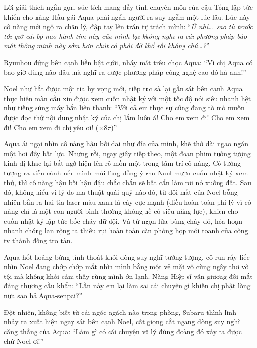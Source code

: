 \documentclass[../main.tex]{subfiles}
\begin{document}
Lời giải thích ngắn gọn, súc tích mang đầy tính chuyên môn của cậu Tổng lập tức khiến cho nàng Hầu gái Aqua phải ngẩn người ra suy ngẫm một lúc lâu. Lúc này cô nàng mới ngộ ra chân lý, đập tay lên trán tự trách mình: ``\textit{Ừ nhỉ\dots\ sao từ trước tới giờ cái bộ não hành tím này của mình lại không nghĩ ra cái phương pháp bảo mật thông minh này sớm hơn chút có phải đỡ khổ rồi không chứ\dots?}''

Ryuuhou đứng bên cạnh liền bật cười, nháy mắt trêu chọc Aqua: ``Vì chị Aqua có bao giờ dùng não đâu mà nghĩ ra được phương pháp công nghệ cao đó hả anh!''

Noel như bắt được một tia hy vọng mới, tiếp tục sà lại gần sát bên cạnh Aqua thực hiện màn cầu xin được xem cuốn nhật ký với một tốc độ nói siêu nhanh hệt như tiếng súng máy bắn liên thanh: ``Với cả em thực sự cũng đang tò mò muốn được đọc thử nội dung nhật ký của chị lắm luôn á! Cho em xem đi! Cho em xem đi! Cho em xem đi chị yêu ơi! (\(\times8\pi\))''

Aqua ái ngại nhìn cô nàng hậu bối dai như đỉa của mình, khẽ thở dài ngao ngán một hơi đầy bất lực. Nhưng rồi, ngay giây tiếp theo, một đoạn phim tưởng tượng kinh dị khác lại bất ngờ hiện lên rõ mồn một trong tâm trí cô nàng. Cô tưởng tượng ra viễn cảnh nếu mình mủi lòng đồng ý cho Noel mượn cuốn nhật ký xem thử, thì cô nàng hậu bối hậu đậu chắc chắn sẽ bất cẩn làm rơi nó xuống đất. Sau đó, không hiểu vì lý do ma thuật quái quỷ nào đó, từ đôi mắt của Noel bỗng nhiên bắn ra hai tia laser màu xanh lá cây cực mạnh (điều hoàn toàn phi lý vì cô nàng chỉ là một con người bình thường không hề có siêu năng lực), khiến cho cuốn nhật ký lập tức bốc cháy dữ dội. Và từ ngọn lửa bùng cháy đó, hỏa hoạn nhanh chóng lan rộng ra thiêu rụi hoàn toàn căn phòng họp mới toanh của công ty thành đống tro tàn.


Aqua hốt hoảng bừng tỉnh thoát khỏi dòng suy nghĩ tưởng tượng, cô run rẩy liếc nhìn Noel đang chớp chớp mắt nhìn mình bằng một vẻ mặt vô cùng ngây thơ vô tội mà không khỏi cảm thấy rùng mình ớn lạnh. Nàng Hiệp sĩ vẫn giương đôi mắt đáng thương cầu khẩn: ``Lần này em lại làm sai cái chuyện gì khiến chị phật lòng nữa sao hả Aqua-senpai?''

Đột nhiên, không biết từ cái ngóc ngách nào trong phòng, Subaru thình lình nhảy ra xuất hiện ngay sát bên cạnh Noel, cất giọng cắt ngang dòng suy nghĩ căng thẳng của Aqua: ``Làm gì có cái chuyện vô lý đùng đoàng đó xảy ra được chứ Noel ơi!''

\end{document}
